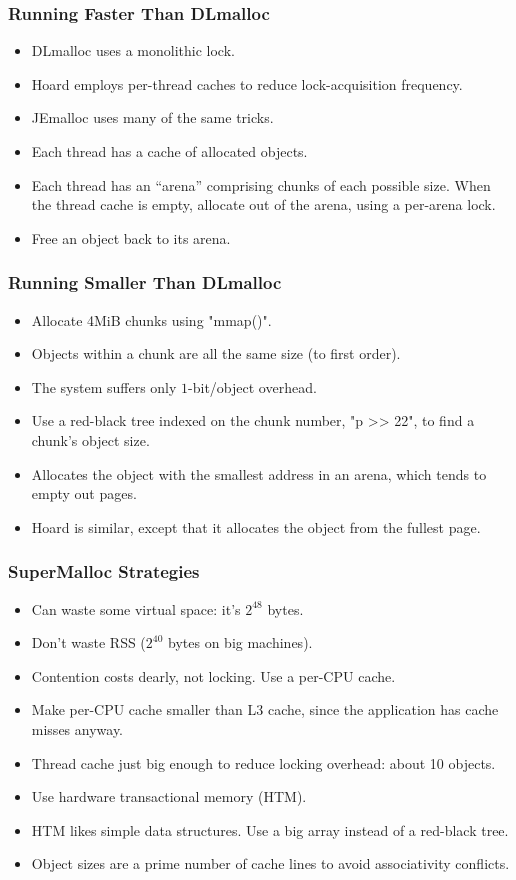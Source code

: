 \documentclass[xcolor=dvipsnames,14pt]{beamer}
\begin{document}
\begin{frame}
\frametitle{Running Faster Than DLmalloc}

\begin{itemize}
\item DLmalloc uses a monolithic lock.
\item Hoard employs per-thread caches to reduce lock-acquisition frequency.
\item JEmalloc uses many of the same tricks.
\item Each thread has a cache of allocated objects.
\item Each thread has an ``arena'' comprising chunks of each possible size.  When the thread cache is empty, allocate out of the arena, using a per-arena lock.
\item Free an object back to its arena.
\end{itemize}

\end{frame}

\begin{frame}[fragile]
\frametitle{Running Smaller Than DLmalloc}

\begin{itemize}
\item Allocate 4MiB chunks using "mmap()".
\item Objects within a chunk are all the same size (to first order).
\item The system suffers only $1$-bit/object overhead.
\item Use a red-black tree indexed on the chunk number, "p >> 22", to find a chunk's object size.
\item Allocates the object with the smallest address in an arena,
which tends to empty out pages.
\item Hoard is similar, except that it allocates the object from the fullest page.
\end{itemize}
\end{frame}

\begin{frame}
\frametitle{SuperMalloc Strategies}

\begin{itemize}
\item Can waste some virtual space: it's $2^{48}$ bytes.
\item Don't waste RSS ($2^{40}$ bytes on big machines).
\item Contention costs dearly, not locking.  Use a per-CPU cache.
\item Make per-CPU cache smaller than L3 cache, since the application
  has cache misses anyway.
\item Thread cache just big enough to reduce locking overhead: about 10 objects.
\item Use hardware transactional memory (HTM).
\item HTM likes simple data structures.  Use a big array instead of a red-black tree.
\item Object sizes are a prime number of cache lines to avoid
  associativity conflicts.
\end{itemize}

\end{frame}
\end{document}
